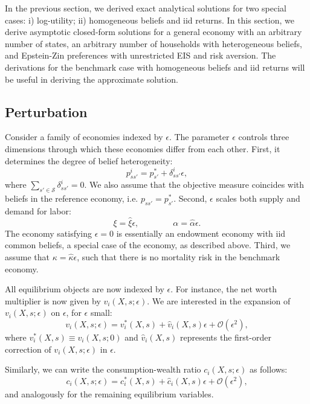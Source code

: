 In the previous section, we derived exact analytical solutions for two special cases: i) log-utility; ii) homogeneous beliefs and iid returns. 
In this section, we derive asymptotic closed-form solutions for a general economy with an arbitrary number of states, an arbitrary number of households with heterogeneous beliefs, and Epstein-Zin preferences with unrestricted EIS and risk aversion.
The derivations for the benchmark case with homogeneous beliefs and iid returns will be useful in deriving the approximate solution.

\subsection{Perturbation}

Consider a family of economies indexed by $\epsilon$. 
The parameter $\epsilon$ controls three dimensions through which these economies differ from each other. First, it determines the degree of belief heterogeneity:
\begin{equation}
    p_{ss'}^i = p_{s'}^* + \delta_{ss'}^i \epsilon,
\end{equation}
where $\sum_{s' \in \mathcal{S}}\delta_{ss'}^i = 0$. 
We also assume that the objective measure coincides with beliefs in the reference economy, i.e. $p_{ss'} = p_{s'}^*$. Second, $\epsilon$ scales both supply and demand for labor:
\begin{equation}
    \xi = \hat{\xi} \epsilon, \qquad \qquad  \alpha = \hat{\alpha} \epsilon.
\end{equation}
The economy satisfying $\epsilon = 0$ is essentially an endowment economy with iid common beliefs, a special case of the \citet{MP85} economy, as described above.
Third, we assume that $\kappa = \hat{\kappa} \epsilon$, such that there is no mortality risk in the benchmark economy.

All equilibrium objects are now indexed by $\epsilon$. For instance, the net worth multiplier is now given by $v_i(X,s; \epsilon)$. We are interested in the expansion of $v_i(X,s; \epsilon)$ on $\epsilon$, for $\epsilon$ small:
\begin{equation}
    v_i(X,s;\epsilon) = v_i^*(X,s) + \hat{v}_i(X,s) \epsilon + \mathcal{O}(\epsilon^2),
\end{equation}
where $v_i^*(X,s) \equiv v_i(X,s; 0)$ and $\hat{v}_i(X,s)$ represents the first-order correction of $v_i(X,s;\epsilon)$ in $\epsilon$.

Similarly, we can write the consumption-wealth ratio  $c_i(X,s;\epsilon)$ as follows:
\begin{equation}
    c_i(X,s;\epsilon) = c_i^*(X,s) + \hat{c}_i(X,s) \epsilon + \mathcal{O}(\epsilon^2),
\end{equation}
and analogously for the remaining equilibrium variables. 

